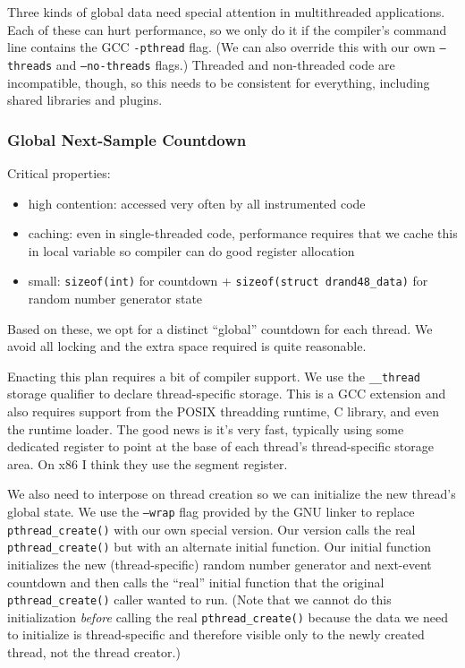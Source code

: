 \documentclass[times,10pt,twocolumn]{article}
\begin{document}
Three kinds of global data need special attention in multithreaded
applications.  Each of these can hurt performance, so we only do it if
the compiler's command line contains the GCC \texttt{-pthread} flag.
(We can also override this with our own \texttt{--threads} and
\texttt{--no-threads} flags.)  Threaded and non-threaded code are
incompatible, though, so this needs to be consistent for everything,
including shared libraries and plugins.

\subsubsection{Global Next-Sample Countdown}

Critical properties:

\begin{itemize}
\item high contention: accessed very often by all instrumented code
\item caching: even in single-threaded code, performance requires that
  we cache this in local variable so compiler can do good register
  allocation
\item small: \texttt{sizeof(int)} for countdown +
  \texttt{sizeof(struct drand48\_data)} for random number generator
  state
\end{itemize}

Based on these, we opt for a distinct ``global'' countdown for each
thread.  We avoid all locking and the extra space required is quite
reasonable.

Enacting this plan requires a bit of compiler support.  We use the
\texttt{\_\_thread} storage qualifier to declare thread-specific
storage.  This is a GCC extension and also requires support from the
POSIX threadding runtime, C library, and even the runtime loader.  The
good news is it's very fast, typically using some dedicated register
to point at the base of each thread's thread-specific storage area.
On x86 I think they use the segment register.

We also need to interpose on thread creation so we can initialize the
new thread's global state.  We use the \texttt{--wrap} flag provided
by the GNU linker to replace \texttt{pthread\_create()} with our own
special version.  Our version calls the real
\texttt{pthread\_create()} but with an alternate initial function.
Our initial function initializes the new (thread-specific) random
number generator and next-event countdown and then calls the ``real''
initial function that the original \texttt{pthread\_create()} caller
wanted to run.  (Note that we cannot do this initialization
\emph{before} calling the real \texttt{pthread\_create()} because the
data we need to initialize is thread-specific and therefore visible
only to the newly created thread, not the thread creator.)
\end{document}
